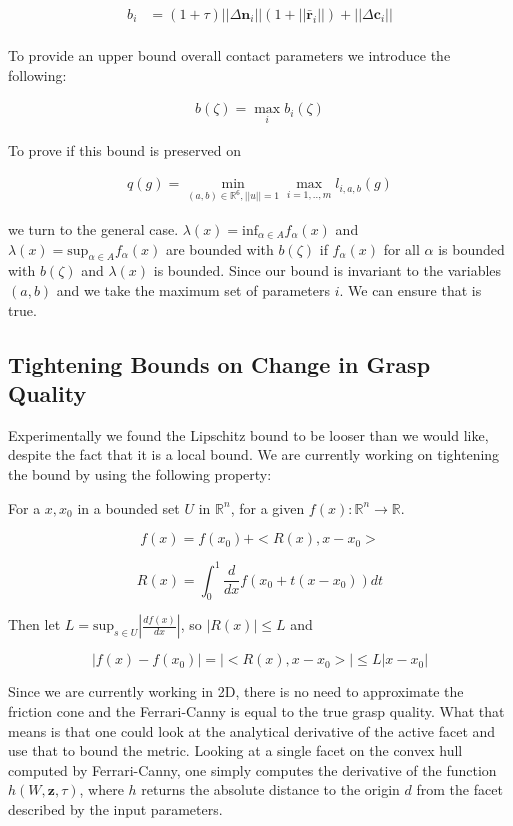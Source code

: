 \documentclass[letterpaper, 10 pt, conference]{ieeeconf}  %
\begin{document}
 \begin{align*}
b_i &= (1+\tau)||\Delta \textbf{n}_{i}||(1+||\bar{\textbf{r}}_i||) + ||\Delta{\textbf{c}_{i}}|| \\
\end{align*}

To provide an upper bound overall contact parameters we introduce the following: 

\begin{align}
b(\zeta)  = \max_{i} b_i(\zeta)
\end{align}

To prove if  this bound is preserved on

 \begin{align}
 q(g) = \min_{(a,b) \in \mathbb{R}^6, ||u||=1} \max_{i=1,..,m} l_{i,a,b}(g)
 \end{align}
 
we turn to the general case.
$\lambda(x) = \mbox{inf}_{\alpha \in A} f_\alpha(x)$ and $\lambda(x) = \mbox{sup}_{\alpha \in A} f_\alpha(x)$ are bounded with $b(\zeta)$ if $f_\alpha(x)$ for all $\alpha$ is bounded with $b(\zeta)$ and $\lambda(x)$ is bounded.
Since our bound is invariant to the variables $(a,b)$ and we take the maximum set of parameters $i$.
We can ensure that is true.


\subsection{Tightening Bounds on Change in Grasp Quality}

Experimentally we found the Lipschitz bound to be looser than we would like, despite the fact that it is a local bound. We are currently working on tightening the bound by using the following property: 

For a $x,x_0$ in a bounded set $U$ in $\mathbb{R}^n$, for a given $f(x):\mathbb{R}^n \rightarrow \mathbb{R}$. 

\[
  f(x) = f(x_0) + <R(x),x-x_0>
\]

\[
  R(x) = \int_0^1 \frac{d}{dx}f(x_0+t(x-x_0)) dt
\]

Then let $L = \mbox{sup}_{s \in U} |\frac{df(x)}{dx} |$, so $|R(x)| \leq L$ and 

\[
  |f(x)-f(x_0)| = |<R(x),x-x_0>| \leq L |x-x_0|
\]


Since we are currently working in 2D, there is no need to approximate the friction cone and the Ferrari-Canny is equal to the true grasp quality. What that means is that one could look at the analytical derivative of the active facet and use that to bound the metric. Looking at a single facet on the convex hull computed by Ferrari-Canny, one simply computes the derivative of the function $h(W,\textbf{z},\tau)$, where $h$ returns the absolute distance to the origin $d$ from the facet described by the input parameters. 
\end{document}
